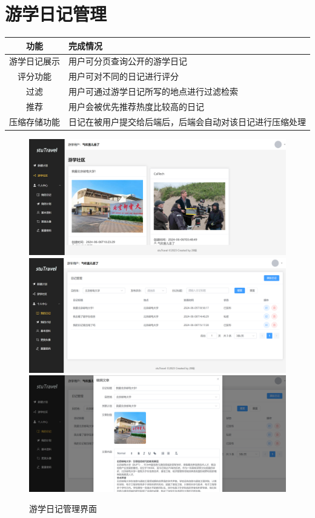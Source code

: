 \documentclass{report}
\begin{document}
\section{游学日记管理}
\begin{table}[!ht]
    \centering
    \begin{tabularx}{\textwidth}{|c|X|}
        \hline
        \textbf{功能} & \textbf{完成情况} \\ \hline
        游学日记展示 & 用户可分页查询公开的游学日记 \\ \hline
        评分功能 & 用户可对不同的日记进行评分 \\ \hline
        过滤 & 用户可通过游学日记所写的地点进行过滤检索 \\ \hline
        推荐 & 用户会被优先推荐热度比较高的日记 \\ \hline
        压缩存储功能 & 日记在被用户提交给后端后，后端会自动对该日记进行压缩处理 \\ \hline
    \end{tabularx}
    
\end{table}
\begin{figure}[h]
    \begin{center}
        \includegraphics*[width=\textwidth]{figure/2.4-dr.png}
        \includegraphics*[width=\textwidth]{figure/2.4-fl.png}
        \includegraphics*[width=\textwidth]{figure/2.4-ed.png}
    \end{center}
    \caption{游学日记管理界面}
\end{figure}
\end{document}
